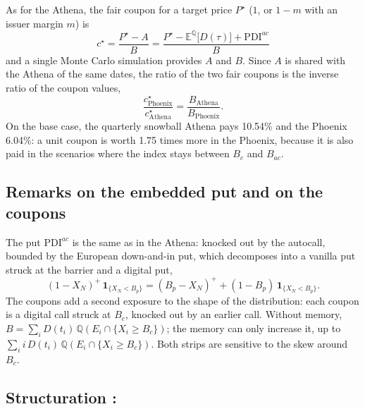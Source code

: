 \documentclass[11pt,a4paper]{article}
\newcommand{\ind}{\mathbf{1}}
\begin{document}
As for the Athena, the fair coupon for a target price $P^\star$ ($1$, or
$1 - m$ with an issuer margin $m$) is
\begin{equation}
  \boxed{\,c^\star = \frac{P^\star - A}{B}
  = \frac{P^\star - \mathbb{E}^{\mathbb{Q}}\bigl[ D(\tau) \bigr] + \mathrm{PDI}^{ac}}{B}\,}
  \label{eq:fair-coupon}
\end{equation}
and a single Monte Carlo simulation provides $A$ and $B$. Since $A$ is
shared with the Athena of the same dates, the ratio of the two fair coupons
is the inverse ratio of the coupon values,
\begin{equation}
  \frac{c^\star_{\mathrm{Phoenix}}}{c^\star_{\mathrm{Athena}}}
  = \frac{B_{\mathrm{Athena}}}{B_{\mathrm{Phoenix}}} .
\end{equation}
On the base case, the quarterly snowball Athena pays 10.54\% and the Phoenix
6.04\%: a unit coupon is worth 1.75 times more in the Phoenix, because it is
also paid in the scenarios where the index stays between $B_c$ and $B_{ac}$.

\subsection{Remarks on the embedded put and on the coupons}

The put $\mathrm{PDI}^{ac}$ is the same as in the Athena: knocked out by
the autocall, bounded by the European down-and-in put, which decomposes
into a vanilla put struck at the barrier and a digital put,
\begin{equation}
  (1 - X_N)^+ \, \ind_{\{X_N < B_p\}}
  = (B_p - X_N)^+ + (1 - B_p)\, \ind_{\{X_N < B_p\}}.
\end{equation}
The coupons add a second exposure to the shape of the distribution: each
coupon is a digital call struck at $B_c$, knocked out by an earlier call.
Without memory, $B = \sum_i D(t_i)\, \mathbb{Q}(E_i \cap \{X_i \ge B_c\})$;
the memory can only increase it, up to $\sum_i i\, D(t_i)\,
\mathbb{Q}(E_i \cap \{X_i \ge B_c\})$. Both strips are sensitive to the skew
around $B_c$.



\subsection{Structuration :}
\end{document}
